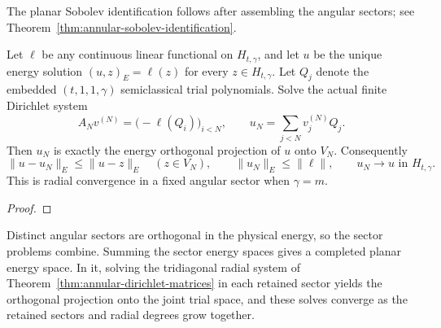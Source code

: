 The planar Sobolev identification follows after assembling the angular sectors;
see Theorem~\ref{thm:annular-sobolev-identification}.

\begin{theorem}
\label{thm:annular-energy-convergence}
\leanok
Let $\ell$ be any continuous linear functional on $H_{t,\gamma}$, and let $u$ be
the unique energy solution $(u,z)_E=\ell(z)$ for every $z\in H_{t,\gamma}$.
Let $Q_j$ denote the embedded $(t,1,1,\gamma)$ semiclassical trial polynomials.
Solve the actual finite Dirichlet system
\[
 A_Nv^{(N)}=\bigl(-\ell(Q_i)\bigr)_{i<N},\qquad
 u_N=\sum_{j<N}v_j^{(N)}Q_j.
\]
Then $u_N$ is exactly the energy orthogonal projection of $u$ onto $V_N$.
Consequently
\[
 \|u-u_N\|_E\le\|u-z\|_E\quad(z\in V_N),\qquad
 \|u_N\|_E\le\|\ell\|,\qquad u_N\longrightarrow u\text{ in }H_{t,\gamma}.
\]
This is radial convergence in a fixed angular sector when $\gamma=m$.

\end{theorem}
\begin{proof}
\leanok
\end{proof}


Distinct angular sectors are orthogonal in the physical energy, so the sector
problems combine. Summing the sector energy spaces gives a completed planar
energy space. In it, solving the tridiagonal radial system of
Theorem~\ref{thm:annular-dirichlet-matrices} in each
retained sector yields the orthogonal projection onto the joint trial space, and
these solves converge as the retained sectors and radial degrees grow together.

